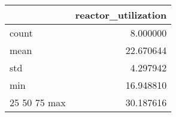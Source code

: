 \begin{tabular}{lr}
\toprule
 & reactor\_utilization \\
\midrule
count & 8.000000 \\
mean & 22.670644 \\
std & 4.297942 \\
min & 16.948810 \\
25%
50%
75%
max & 30.187616 \\
\bottomrule
\end{tabular}

